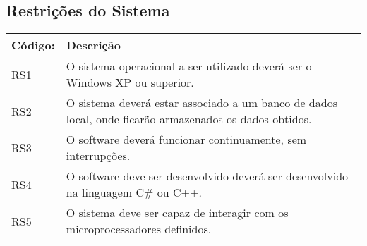 \subsection*{Restrições do Sistema}
\begin{table}[!htp]
\centering
\begin{tabular}{|p{4cm}|p{10cm}|}\hline
\textbf{Código:}&\textbf{Descrição}\\ \hline
RS1	&O sistema operacional a ser utilizado deverá ser o Windows XP ou superior.\\ \hline
RS2	&O sistema deverá estar associado a um banco de dados local, onde ficarão armazenados os dados obtidos.\\ \hline
RS3	&O software deverá funcionar continuamente, sem interrupções.\\ \hline
RS4	&O software deve ser desenvolvido deverá ser desenvolvido na linguagem C\# ou C++.\\ \hline
RS5	&O sistema deve ser capaz de interagir com os microprocessadores definidos.\\ \hline

\end{tabular}
\end{table}
%
